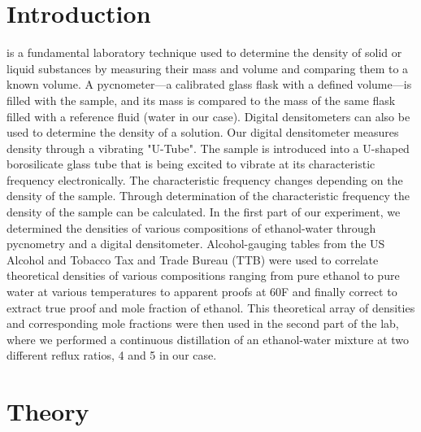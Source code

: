 \documentclass[lettersize,journal]{IEEEtran}
\begin{document}
	\section{Introduction}
	 is a fundamental laboratory technique used to determine the density of solid or liquid substances by measuring their mass and volume and comparing them to a known volume. A pycnometer—a calibrated glass flask with a defined volume—is filled with the sample, and its mass is compared to the mass of the same flask filled with a reference fluid (water in our case). Digital densitometers can also be used to determine the density of a solution. Our digital densitometer measures density through a vibrating "U-Tube". The sample is introduced into a U-shaped borosilicate glass tube that is being excited to vibrate at its characteristic frequency electronically. The characteristic frequency changes depending on the density of the sample. Through determination of the characteristic frequency the density of the sample can be calculated. In the first part of our experiment, we determined the densities of various compositions of ethanol-water through pycnometry and a digital densitometer. Alcohol-gauging tables from the US Alcohol and Tobacco Tax and Trade Bureau (TTB) were used to correlate theoretical densities of various compositions ranging from pure ethanol to pure water at various temperatures to apparent proofs at 60F and finally correct to extract true proof and mole fraction of ethanol.
	\newline
	\newline
	\-\hspace{0.6cm}This theoretical array of densities and corresponding mole fractions were then used in the second part of the lab, where we performed a continuous distillation of an ethanol-water mixture at two different reflux ratios, 4 and 5 in our case. 
	
	\section{Theory}
\end{document}
